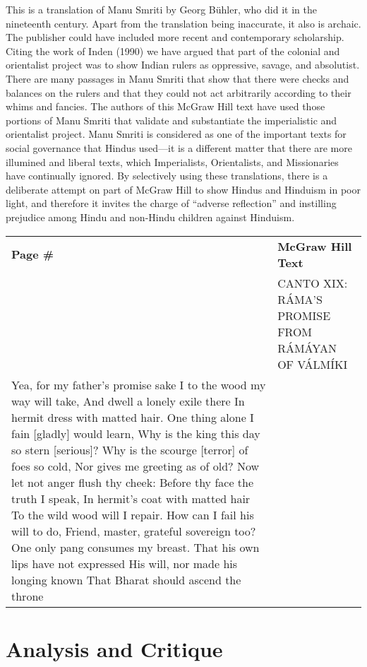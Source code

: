 This is a translation of Manu Smriti by Georg Bühler, who did it in the nineteenth century. Apart from the translation being inaccurate, it also is archaic. The publisher could have included more recent and contemporary scholarship. Citing the work of Inden (1990) we have argued that part of the colonial and orientalist project was to show Indian rulers as oppressive, savage, and absolutist. There are many passages in Manu Smriti that show that there were checks and balances on the rulers and that they could not act arbitrarily according to their whims and fancies. The authors of this McGraw Hill text have used those portions of Manu Smriti that validate and substantiate the imperialistic and orientalist project. Manu Smriti is considered as one of the important texts for social governance that Hindus used—it is a different matter that there are more illumined and liberal texts, which Imperialists, Orientalists, and Missionaries have continually ignored. By selectively using these translations, there is a deliberate attempt on part of McGraw Hill to show Hindus and Hinduism in poor light, and therefore it invites the charge of “adverse reflection” and instilling prejudice among Hindu and non-Hindu children against Hinduism.

\begin{longtable}{|>{\raggedleft}p{1.5cm}|p{8.5cm}|}
\multicolumn{2}{c}{\textbf{Table: 6}}\\ 
\hline
\textbf{Page \#} & \textbf{McGraw Hill Text} \tabularnewline
\hline 
281 & \raggedright CANTO XIX: RÁMA’S PROMISE FROM RÁMÁYAN OF VÁLMÍKI\\ Yea, for my father’s promise sake I to the wood my way will take, And dwell a lonely exile there In hermit dress with matted hair. One thing alone I fain [gladly] would learn, Why is the king this day so stern [serious]? Why is the scourge [terror] of foes so cold, Nor gives me greeting as of old? Now let not anger flush thy cheek: Before thy face the truth I speak, In hermit’s coat with matted hair To the wild wood will I repair. How can I fail his will to do, Friend, master, grateful sovereign too? One only pang consumes my breast. That his own lips have not expressed His will, nor made his longing known That Bharat should ascend the throne\tabularnewline
\hline
\end{longtable}

\section*{Analysis and Critique} 

